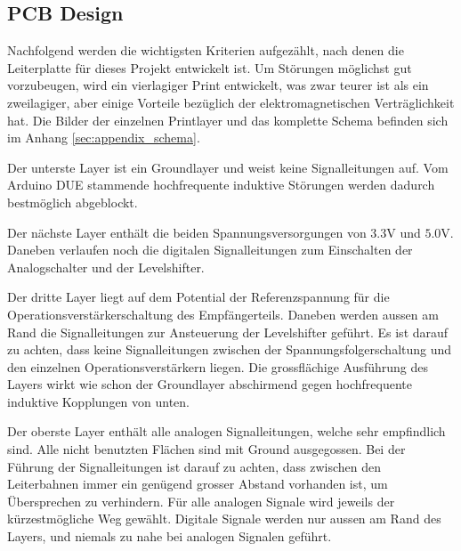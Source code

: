 \subsection{PCB Design}\label{sec:pcb_design}
Nachfolgend werden die wichtigsten Kriterien aufgezählt, nach denen die Leiterplatte für dieses Projekt entwickelt ist. Um Störungen möglichst gut vorzubeugen, wird ein vierlagiger Print entwickelt, was zwar teurer ist als ein zweilagiger, aber einige Vorteile bezüglich der elektromagnetischen Verträglichkeit hat. Die Bilder der einzelnen Printlayer und das komplette Schema befinden sich im Anhang \ref{sec:appendix_schema}.

Der unterste Layer ist ein Groundlayer und weist keine Signalleitungen auf. Vom Arduino DUE stammende hochfrequente induktive Störungen werden dadurch bestmöglich abgeblockt.

Der nächste Layer enthält die beiden Spannungsversorgungen von $3.3 \mathrm{V}$ und $5.0 \mathrm{V}$. Daneben verlaufen noch die digitalen Signalleitungen zum Einschalten der Analogschalter und der Levelshifter.

Der dritte Layer liegt auf dem Potential der Referenzspannung für die Operationsverstärkerschaltung des Empfängerteils. Daneben werden aussen am Rand die Signalleitungen zur Ansteuerung der Levelshifter geführt. Es ist darauf zu achten, dass keine Signalleitungen zwischen der Spannungsfolgerschaltung und den einzelnen Operationsverstärkern liegen. Die grossflächige Ausführung des Layers wirkt wie schon der Groundlayer abschirmend gegen hochfrequente induktive Kopplungen von unten.

Der oberste Layer enthält alle analogen Signalleitungen, welche sehr empfindlich sind. Alle nicht benutzten Flächen sind mit Ground ausgegossen. Bei der Führung der Signalleitungen ist darauf zu achten, dass zwischen den Leiterbahnen immer ein genügend grosser Abstand vorhanden ist, um Übersprechen zu verhindern. Für alle analogen Signale wird jeweils der kürzestmögliche Weg gewählt. Digitale Signale werden nur aussen am Rand des Layers, und niemals zu nahe bei analogen Signalen geführt.
